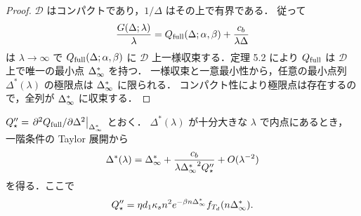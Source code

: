 \begin{proof}
$\mathcal{D}$ はコンパクトであり，$1/\Delta$ はその上で有界である．
従って
\[
  \frac{G(\Delta;\lambda)}{\lambda}
  =Q_{\mathrm{full}}(\Delta;\alpha,\beta)+\frac{c_b}{\lambda\Delta}
\]
は $\lambda\to\infty$ で $Q_{\mathrm{full}}(\Delta;\alpha,\beta)$ に
$\mathcal{D}$ 上一様収束する．定理 5.2 により
$Q_{\mathrm{full}}$ は $\mathcal{D}$ 上で唯一の最小点 $\Delta_\infty^\ast$ を持つ．
一様収束と一意最小性から，任意の最小点列
$\Delta^\ast(\lambda)$ の極限点は $\Delta_\infty^\ast$ に限られる．
コンパクト性により極限点は存在するので，全列が $\Delta_\infty^\ast$ に収束する．
\end{proof}

\begin{corollary}[有限頻度での近似]
$Q''_\star=\left.\partial^2Q_{\mathrm{full}}/\partial\Delta^2\right|_{\Delta_\infty^\ast}$ とおく．
$\Delta^\ast(\lambda)$ が十分大きな $\lambda$ で内点にあるとき，
一階条件の Taylor 展開から
\[
  \Delta^\ast(\lambda)
  =\Delta_\infty^\ast+\frac{c_b}{\lambda{\Delta_\infty^\ast}^2 Q''_\star}
  +O(\lambda^{-2})
\]
を得る．ここで
\[
  Q''_\star
  =\eta d_1\kappa_s n^2 e^{-\beta n\Delta_\infty^\ast}f_{T_d}(n\Delta_\infty^\ast).
\]
\end{corollary}
